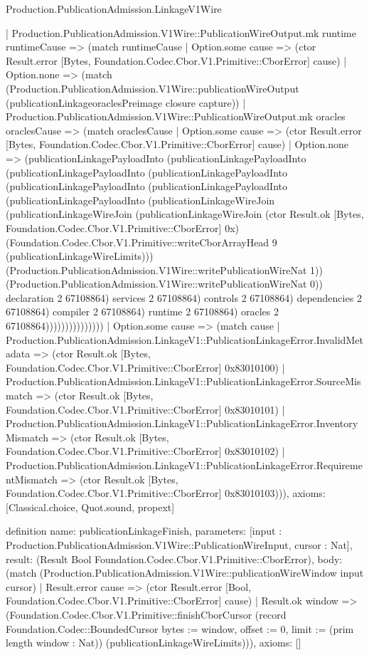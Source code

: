 \begin{lexlean}{Production.PublicationAdmission.LinkageV1Wire}
\begin{semanticmodule}
{                          | Production.PublicationAdmission.V1Wire::PublicationWireOutput.mk runtime runtimeCause => (match runtimeCause
                            | Option.some cause => (ctor Result.error [Bytes, Foundation.Codec.Cbor.V1.Primitive::CborError] cause)
                            | Option.none => (match (Production.PublicationAdmission.V1Wire::publicationWireOutput (publicationLinkageoraclesPreimage closure capture))
                              | Production.PublicationAdmission.V1Wire::PublicationWireOutput.mk oracles oraclesCause => (match oraclesCause
                                | Option.some cause => (ctor Result.error [Bytes, Foundation.Codec.Cbor.V1.Primitive::CborError] cause)
                                | Option.none => (publicationLinkagePayloadInto (publicationLinkagePayloadInto (publicationLinkagePayloadInto (publicationLinkagePayloadInto (publicationLinkagePayloadInto (publicationLinkagePayloadInto (publicationLinkagePayloadInto (publicationLinkageWireJoin (publicationLinkageWireJoin (publicationLinkageWireJoin (ctor Result.ok [Bytes, Foundation.Codec.Cbor.V1.Primitive::CborError] 0x) (Foundation.Codec.Cbor.V1.Primitive::writeCborArrayHead 9 (publicationLinkageWireLimits))) (Production.PublicationAdmission.V1Wire::writePublicationWireNat 1)) (Production.PublicationAdmission.V1Wire::writePublicationWireNat 0)) declaration 2 67108864) services 2 67108864) controls 2 67108864) dependencies 2 67108864) compiler 2 67108864) runtime 2 67108864) oracles 2 67108864)))))))))))))))
    | Option.some cause => (match cause
      | Production.PublicationAdmission.LinkageV1::PublicationLinkageError.InvalidMetadata => (ctor Result.ok [Bytes, Foundation.Codec.Cbor.V1.Primitive::CborError] 0x83010100)
      | Production.PublicationAdmission.LinkageV1::PublicationLinkageError.SourceMismatch => (ctor Result.ok [Bytes, Foundation.Codec.Cbor.V1.Primitive::CborError] 0x83010101)
      | Production.PublicationAdmission.LinkageV1::PublicationLinkageError.InventoryMismatch => (ctor Result.ok [Bytes, Foundation.Codec.Cbor.V1.Primitive::CborError] 0x83010102)
      | Production.PublicationAdmission.LinkageV1::PublicationLinkageError.RequirementMismatch => (ctor Result.ok [Bytes, Foundation.Codec.Cbor.V1.Primitive::CborError] 0x83010103))),
  axioms: [Classical.choice, Quot.sound, propext]
}

definition{
  name: publicationLinkageFinish,
  parameters: [input : Production.PublicationAdmission.V1Wire::PublicationWireInput, cursor : Nat],
  result: (Result Bool Foundation.Codec.Cbor.V1.Primitive::CborError),
  body: (match (Production.PublicationAdmission.V1Wire::publicationWireWindow input cursor)
    | Result.error cause => (ctor Result.error [Bool, Foundation.Codec.Cbor.V1.Primitive::CborError] cause)
    | Result.ok window => (Foundation.Codec.Cbor.V1.Primitive::finishCborCursor (record Foundation.Codec::BoundedCursor {bytes := window, offset := 0, limit := (prim length window : Nat)}) (publicationLinkageWireLimits))),
  axioms: []
}


\end{semanticmodule}
\end{lexlean}
